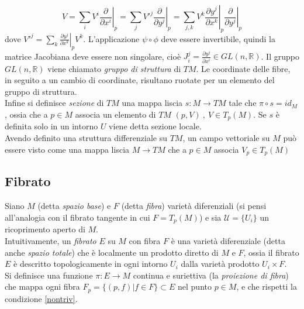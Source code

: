 $$
   V = \sum_i V^i  \left. \frac{\partial}{\partial x^i} \right |_p
     = \sum_j V'^j \left. \frac{\partial}{\partial y^j} \right |_p
     = \sum_{j,k}  V^k \left. \frac{\partial y^j}{\partial x^k} \right |_p
        \left. \frac{\partial}{\partial y^j} \right |_p
$$
dove $V'^j = \sum_k \left. \frac{\partial y^j}{\partial x^k}\right |_pV^k $.
L'applicazione $\psi \circ \phi$ deve essere invertibile, quindi la matrice Jacobiana
deve essere non singolare, cioè $J^j_i = \frac{\partial y^j}{\partial x^i} \in GL(n,\mathbb{R})$.
%
Il gruppo $GL(n,\mathbb{R})$ viene chiamato \emph{gruppo di struttura} di $TM$.
Le coordinate delle fibre, in seguito a un cambio di coordinate, risultano ruotate
per un elemento del gruppo di struttura.\\
%
Infine si definisce \emph{sezione} di $TM$ una mappa liscia $s : M \to TM$ tale
che $\pi \circ s = id_M$, ossia che a $p \in M$ associa un elemento di $TM$ $(p,V)
\: ,\: V \in T_p(M)$. Se $s$ è definita solo in un intorno $U$ viene detta sezione locale.\\

Avendo definito una struttura differenziale su $TM$, un campo vettoriale su $M$
può essere visto come una mappa liscia $M \to TM$ che a $p \in M$ associa $V_p \in T_p(M)$\\

\subsection{Fibrato}
Siano $M$ (detta \emph{spazio base}) e $F$ (detta \emph{fibra}) varietà diferenziali
(si pensi all'analogia con il fibrato tangente in cui $F=T_p(M)$) e sia
$\mathcal{U} = \{U_i\}$ un ricoprimento aperto di $M$.\\

Intuitivamente, un \emph{fibrato} $E$ su $M$ con fibra $F$ è una varietà diferenziale
(detta anche \emph{spazio totale}) che è localmente un prodotto diretto di $M$ e $F$,
ossia il fibrato $E$ è descritto topologicamente in ogni intorno $U_i$
dalla varietà prodotto $U_i \times F$.\\

Si definisce una funzione $\pi : E \to M$ continua e suriettiva (la
\emph{proiezione di fibra}) che mappa ogni fibra $F_p = \{ (p,f) | f \in F\}
\subset E$ nel punto $ p\in M$, e che rispetti la condizione \ref{nontriv}.\\

